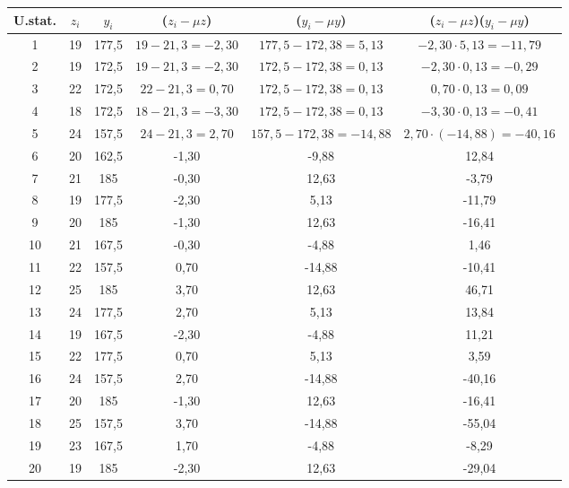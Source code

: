 \begin{esempio}
    \begin{adjustwidth}{-.5in}{-.5in}
\begin{center}
\vspace{6pt}
\noindent
\begin{tabular}{|c|c|c|c|c|c|}
\hline
U.stat. &      \(z_i\)&  \(y_i\)&  (\(z_i-\mu z\)) & 
(\(y_i-\mu y\))&(\(z_i-\mu z\))(\(y_i-\mu y\))\\\hline
1&      19&     177,5&  \(19-21,3=-2,30\) &       \(177,5-172,38=5,13\)&
\(-2,30 \cdot 5,13=-11,79\)\\\hline
2&      19&     172,5&  \(19-21,3=-2,30\)&     \(172,5-172,38=0,13\)&
\(-2,30 \cdot 0,13=-0,29\)\\\hline
3&      22&     172,5&  \(22-21,3=0,70\)&      \(172,5-172,38=0,13\)&   
\(0,70 \cdot 0,13=0,09\)\\\hline
4&      18&     172,5&  \(18-21,3=-3,30\)&     \(172,5-172,38=0,13\)&   
\(-3,30 \cdot 0,13=-0,41\)\\\hline
5&      24&     157,5&  \(24-21,3=2,70\)&      \(157,5-172,38=-14,88\)& 
\(2,70 \cdot (-14,88)=-40,16\)\\\hline
6&      20&     162,5&  -1,30&  -9,88&  12,84\\\hline
7&      21&     185&    -0,30&  12,63&  -3,79\\\hline
8&      19&     177,5&  -2,30&  5,13&   -11,79\\\hline
9&      20      &185&   -1,30&  12,63&  -16,41\\\hline
10&     21&     167,5&  -0,30&  -4,88&  1,46\\\hline
11&     22&     157,5&  0,70&   -14,88& -10,41\\\hline
12&     25&     185&    3,70&   12,63&  46,71\\\hline
13&     24&     177,5&  2,70&   5,13&   13,84\\\hline
14&     19&     167,5&  -2,30&  -4,88&  11,21\\\hline
15&     22&     177,5&  0,70&   5,13&   3,59\\\hline
16&     24&     157,5&  2,70&   -14,88& -40,16\\\hline
17&     20&     185&    -1,30&  12,63&  -16,41\\\hline
18&     25&     157,5   &3,70&  -14,88& -55,04\\\hline
19&     23&     167,5   &1,70&  -4,88&  -8,29\\\hline
20&     19      &185&   -2,30&  12,63&  -29,04\\\hline
\end{tabular}
\end{center}
    \end{adjustwidth}


\end{esempio}
